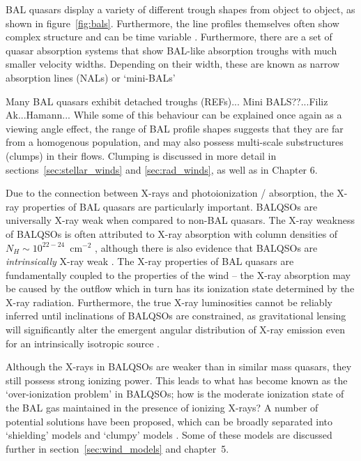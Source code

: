 BAL quasars display a variety of different trough shapes from object 
to object, as shown in figure~\ref{fig:bals}. Furthermore, the 
line profiles themselves often show complex structure 
\citep{foltz1987,ganguly2006, simonhamann2010} and can be time variable 
\citep{hall2011, capellupo2011,capellupo2012,capellupo2014, filizak2012}. Furthermore,
there are a set of quasar absorption systems that show
BAL-like absorption troughs with much smaller velocity widths. Depending 
on their width, these are known as narrow absorption lines (NALs)
or `mini-BALs'

Many BAL quasars exhibit detached troughs (REFs)...
Mini BALS??...Filiz Ak...Hamann...
While some of this behaviour can be explained once again as a viewing angle
effect, the range of BAL profile shapes suggests that they 
are far from a homogenous population, and may also possess
multi-scale substructures (clumps) in their flows. Clumping
is discussed in more detail in sections~\ref{sec:stellar_winds} and 
\ref{sec:rad_winds}, as well as in Chapter 6.

Due to the connection between X-rays and photoionization / absorption, the 
X-ray properties of BAL quasars are particularly important. BALQSOs
are universally X-ray weak when compared to non-BAL quasars. 
The X-ray weakness of BALQSOs is often attributed to X-ray absorption 
with column densities of $N_H \sim 10^{22-24}$~cm$^{-2}$ 
\citep{gallagher1999,gallagher2002,green2001,grupe2003,stalin2011},
although there is also evidence that BALQSOs are {\em intrinsically}
X-ray weak \citep{sabra2001,clavel2006,morabito2013}.
The X-ray properties of BAL quasars are fundamentally coupled to 
the properties of the wind -- the X-ray absorption may be caused by 
the outflow which in turn has its ionization state 
determined by the X-ray radiation. Furthermore, the true X-ray 
luminosities cannot be reliably inferred until inclinations of BALQSOs are
constrained, as gravitational lensing will significantly alter the
emergent angular distribution of X-ray emission even for an intrinsically
isotropic source \citep{chen2013a, chen2013b}.

Although the X-rays in BALQSOs are weaker than in similar mass quasars,
they still possess strong ionizing power. This leads to what has become
known as the `over-ionization problem' in BALQSOs; how is the moderate 
ionization state of the BAL gas maintained in the presence of ionizing 
X-rays? A number of potential solutions have been proposed, which can be 
broadly separated into `shielding' models \citep{MCGV95,PK04} and `clumpy'
models \citep{dekool1995,hamann2013}. Some of these models are discussed
further in section~\ref{sec:wind_models} and chapter~5.

